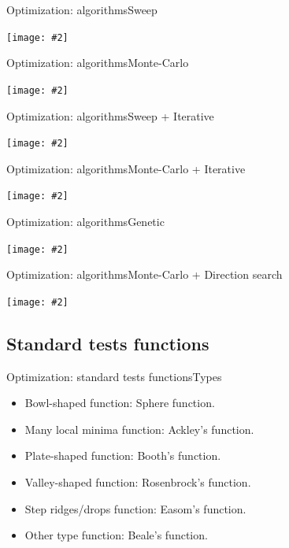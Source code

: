 \documentclass[10pt]{beamer}
\newcommand{\FIGURE}[2]
{
	\begin{center}
		\texttt{[image: \#2]}
	\end{center}
}
\begin{document}
\begin{frame}{Optimization: algorithms}{Sweep}
	\FIGURE{width=0.65\textwidth}{sphere-variables-sw-50-50-1.eps}
\end{frame}

\begin{frame}{Optimization: algorithms}{Monte-Carlo}
	\FIGURE{width=0.65\textwidth}{sphere-variables-mc-2500-1.eps}
\end{frame}

\begin{frame}{Optimization: algorithms}{Sweep + Iterative}
	\FIGURE{width=0.65\textwidth}{sphere-variables-sw-10-10-25-10-0.5.eps}
\end{frame}

\begin{frame}{Optimization: algorithms}{Monte-Carlo + Iterative}
	\FIGURE{width=0.65\textwidth}{sphere-variables-mc-100-25-10-0.1.eps}
\end{frame}

\begin{frame}{Optimization: algorithms}{Genetic}
	\FIGURE{width=0.65\textwidth}{sphere-variables-ge-250-16-0.2-0.2-0.2-32.eps}
\end{frame}

\begin{frame}{Optimization: algorithms}{Monte-Carlo + Direction search}
	\FIGURE{width=0.65\textwidth}{sphere-variables-mc-ra-100-1-600-4-0.1-1.eps}
\end{frame}

\subsection{Standard tests functions}

\begin{frame}{Optimization: standard tests functions}{Types}
\begin{itemize}
\item Bowl-shaped function: Sphere function.
\item Many local minima function: Ackley's function.
\item Plate-shaped function: Booth's function.
\item Valley-shaped function: Rosenbrock's function.
\item Step ridges/drops function: Easom's function.
\item Other type function: Beale's function.
\end{itemize}
\end{frame}
\end{document}
